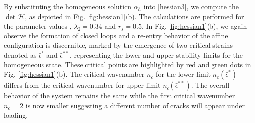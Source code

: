 By substituting the homogeneous solution $\alpha_h$ into \eqref{hessian3}, we compute  the $\det \mathcal{H}$, as depicted  in Fig. \ref{fig:hessian1}(b). The calculations are performed for the parameter values , $\lambda_2=0.34$ and $r_s=0.5$.  In Fig. \ref{fig:hessian1}(b), we again observe the formation of closed loops and a re-entry behavior of the affine configuration is discernible, marked by the emergence of two critical strains denoted as $\bar\epsilon^*$ and $\bar\epsilon^{**}$, representing the lower and upper stability limits for the homogeneous state. These critical points are highlighted by red and green dots in Fig. \ref{fig:hessian1}(b). The critical wavenumber $n_c$ for the lower limit $n_c(\bar{\epsilon}^*)$    differs from the critical wavenumber for  upper limit $n_c(\bar{\epsilon}^{**})$. The overall behavior of the system remains the same while the first critical wavenumber $n_c=2$ is now smaller suggesting a different number of cracks will appear under loading.
